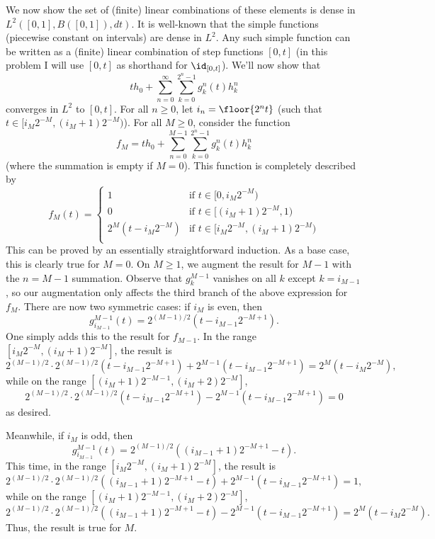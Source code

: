 \documentclass{scrartcl}
\begin{document}
We now show the set of (finite) linear combinations of these elements is dense in $L^2([0,1], B([0,1]), dt)$. It is well-known that the simple functions (piecewise constant on intervals) are dense in $L^2$. Any such simple function can be written as a (finite) linear combination of step functions $[0,t]$ (in this problem I will use $[0,t]$ as shorthand for $\id_{[0,t]}$). We'll now show that
\[
    t h_0 + \sum_{n=0}^\infty \sum_{k=0}^{2^n-1} g^n_k(t) h^n_k    
\]
converges in $L^2$ to $[0,t]$. For all $n\geq 0$, let $i_n = \floor{2^n t}$ (such that $t\in [i_M2^{-M}, (i_M+1)2^{-M})$).
For all $M\geq 0$, consider the function
\[
    f_M = t h_0 + \sum_{n=0}^{M-1} \sum_{k=0}^{2^n-1} g^n_k(t) h^n_k
\]
(where the summation is empty if $M = 0$). This function is completely described by
\[
    f_M(t) = \begin{cases}
        1 & \text{if } t \in [0, i_M 2^{-M})\\
        0 & \text{if } t \in [(i_M + 1) 2^{-M}, 1)\\
        2^M(t - i_M 2^{-M}) & \text{if } t \in [i_M 2^{-M}, (i_M+1) 2^{-M})\\
        \end{cases}
\]
This can be proved by an essentially straightforward induction. As a base case, this is clearly true for $M = 0$. On $M\geq 1$, we augment the result for $M-1$ with the $n = M-1$ summation. Observe that $g^{M-1}_k$ vanishes on all $k$ except $k = i_{M-1}$, so our augmentation only affects the third branch of the above expression for $f_M$. There are now two symmetric cases: if $i_M$ is even, then
\[
    g^{M-1}_{i_{M-1}}(t) = 2^{(M-1)/2}\left(t - i_{M-1}2^{-M+1}\right).
\]
One simply adds this to the result for $f_{M-1}$. In the range $[i_M 2^{-M}, (i_M + 1)2^{-M}]$, the result is
\[
    2^{(M-1)/2}\cdot 2^{(M-1)/2}\left(t - i_{M-1}2^{-M+1}\right) + 2^{M-1}(t - i_{M-1} 2^{-M+1}) = 2^M(t - i_M 2^{-M}),
\]
while on the range $[(i_M + 1)2^{-M-1}, (i_M + 2)2^{-M}]$,
\[
    2^{(M-1)/2}\cdot 2^{(M-1)/2}\left(t - i_{M-1}2^{-M+1}\right) - 2^{M-1}(t - i_{M-1} 2^{-M+1}) = 0
\]
as desired.

Meanwhile, if $i_M$ is odd, then
\[
    g^{M-1}_{i_{M-1}}(t) = 2^{(M-1)/2}\left((i_{M-1} + 1)2^{-M+1} - t\right).
\]
This time, in the range $[i_M 2^{-M}, (i_M + 1)2^{-M}]$, the result is
\[
    2^{(M-1)/2}\cdot 2^{(M-1)/2}\left((i_{M-1} + 1)2^{-M+1} - t\right) + 2^{M-1}(t - i_{M-1} 2^{-M+1}) = 1,
\]
while on the range $[(i_M + 1)2^{-M-1}, (i_M + 2)2^{-M}]$,
\[
    2^{(M-1)/2}\cdot 2^{(M-1)/2}\left((i_{M-1} + 1)2^{-M+1} - t\right) - 2^{M-1}(t - i_{M-1} 2^{-M+1}) = 2^M(t - i_M 2^{-M}).
\]
Thus, the result is true for $M$.
\end{document}
